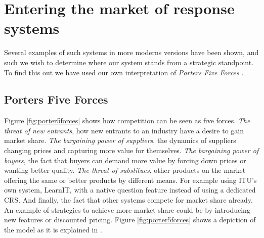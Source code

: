 \section{Entering the market of response systems}

Several examples of such systems in more moderns versions have been shown, and such we wish to determine where our system stands from a strategic standpoint. To find this out we have used our own interpretation of \emph{Porters Five Forces} \cite{porter1979competitive}.


\subsection{Porters Five Forces}
Figure \ref{fig:porter5forces} shows how competition can be seen as five forces. 
\emph{The threat of new entrants}, how new entrants to an industry have a desire to gain market share. \emph{The bargaining power of suppliers}, the dynamics of suppliers changing prices and capturing more value for themselves. \emph{The bargaining power of buyers}, the fact that buyers can demand more value by forcing down prices or wanting better quality. \emph{The threat of substitues}, other products on the market offering the same or better products by different means. For example using ITU's own system, LearnIT, with a native question feature instead of using a dedicated CRS. And finally, the fact that other systems compete for market share already. An example of strategies to achieve more market share could be by introducing new features or discounted pricing. Figure \ref{fig:porter5forces} shows a depiction of the model as it is explained in .


